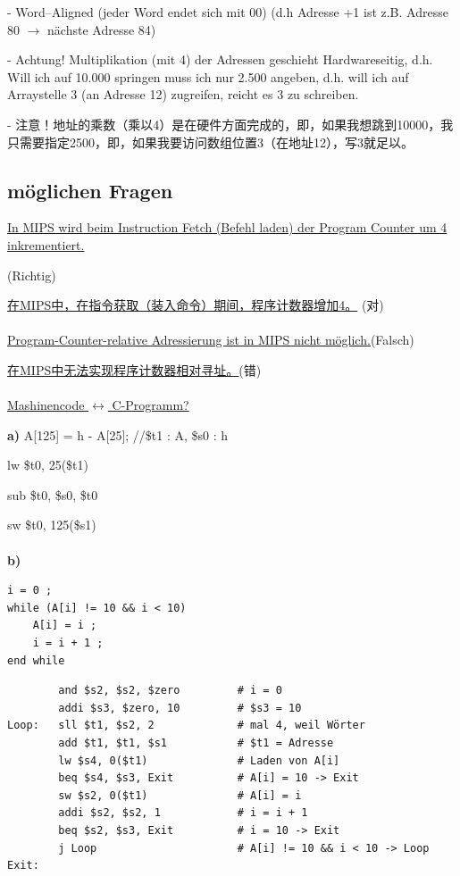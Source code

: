 \documentclass[fleqn]{article}
\begin{document}
- Word–Aligned (jeder Word endet sich mit 00) (d.h Adresse +1 ist z.B. Adresse 80 $\rightarrow$ nächste Adresse 84)

- Achtung! Multiplikation (mit 4) der Adressen geschieht Hardwareseitig, d.h. Will ich auf 10.000 springen muss ich nur 2.500 angeben, d.h. will ich auf Arraystelle 3 (an Adresse 12) zugreifen, reicht es 3 zu schreiben.

- 注意！地址的乘数（乘以4）是在硬件方面完成的，即，如果我想跳到10000，我只需要指定2500，即，如果我要访问数组位置3（在地址12），写3就足以。

\subsection{möglichen Fragen}

\noindent\underline{In MIPS wird beim Instruction Fetch (Befehl laden) der Program Counter um 4 inkrementiert.} 

(Richtig)

\underline{在MIPS中，在指令获取（装入命令）期间，程序计数器增加4。} (对)
\\
\\
\underline{Program-Counter-relative Adressierung ist in MIPS nicht möglich.}(Falsch)

\underline{在MIPS中无法实现程序计数器相对寻址。}(错)
\\
\\
\noindent\underline{Mashinencode $\leftrightarrow$ C-Programm?}

\noindent\textbf{a)} A[125] = h - A[25];  \qquad\qquad//\$t1 : A, \$s0 : h

\indent\indent lw \$t0, 25(\$t1)

\indent\indent sub \$t0, \$s0, \$t0

\indent\indent sw \$t0, 125(\$s1)
\\
\\
\textbf{b)}

\begin{lstlisting}
i = 0 ; 
while (A[i] != 10 && i < 10) 
    A[i] = i ; 
    i = i + 1 ;
end while
\end{lstlisting}

\begin{lstlisting}
        and $s2, $s2, $zero         # i = 0 
        addi $s3, $zero, 10         # $s3 = 10
Loop:   sll $t1, $s2, 2             # mal 4, weil Wörter
        add $t1, $t1, $s1           # $t1 = Adresse 
        lw $s4, 0($t1)              # Laden von A[i]
        beq $s4, $s3, Exit          # A[i] = 10 -> Exit 
        sw $s2, 0($t1)              # A[i] = i 
        addi $s2, $s2, 1            # i = i + 1
        beq $s2, $s3, Exit          # i = 10 -> Exit 
        j Loop                      # A[i] != 10 && i < 10 -> Loop
Exit: 
\end{lstlisting}
\end{document}
